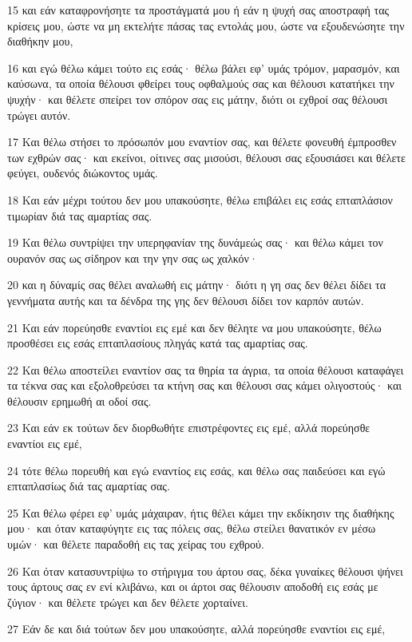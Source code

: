 \par 15 και εάν καταφρονήσητε τα προστάγματά μου ή εάν η ψυχή σας αποστραφή τας κρίσεις μου, ώστε να μη εκτελήτε πάσας τας εντολάς μου, ώστε να εξουδενώσητε την διαθήκην μου,
\par 16 και εγώ θέλω κάμει τούτο εις εσάς· θέλω βάλει εφ' υμάς τρόμον, μαρασμόν, και καύσωνα, τα οποία θέλουσι φθείρει τους οφθαλμούς σας και θέλουσι κατατήκει την ψυχήν· και θέλετε σπείρει τον σπόρον σας εις μάτην, διότι οι εχθροί σας θέλουσι τρώγει αυτόν.
\par 17 Και θέλω στήσει το πρόσωπόν μου εναντίον σας, και θέλετε φονευθή έμπροσθεν των εχθρών σας· και εκείνοι, οίτινες σας μισούσι, θέλουσι σας εξουσιάσει και θέλετε φεύγει, ουδενός διώκοντος υμάς.
\par 18 Και εάν μέχρι τούτου δεν μου υπακούσητε, θέλω επιβάλει εις εσάς επταπλάσιον τιμωρίαν διά τας αμαρτίας σας.
\par 19 Και θέλω συντρίψει την υπερηφανίαν της δυνάμεώς σας· και θέλω κάμει τον ουρανόν σας ως σίδηρον και την γην σας ως χαλκόν·
\par 20 και η δύναμίς σας θέλει αναλωθή εις μάτην· διότι η γη σας δεν θέλει δίδει τα γεννήματα αυτής και τα δένδρα της γης δεν θέλουσι δίδει τον καρπόν αυτών.
\par 21 Και εάν πορεύησθε εναντίοι εις εμέ και δεν θέλητε να μου υπακούσητε, θέλω προσθέσει εις εσάς επταπλασίους πληγάς κατά τας αμαρτίας σας.
\par 22 Και θέλω αποστείλει εναντίον σας τα θηρία τα άγρια, τα οποία θέλουσι καταφάγει τα τέκνα σας και εξολοθρεύσει τα κτήνη σας και θέλουσι σας κάμει ολιγοστούς· και θέλουσιν ερημωθή αι οδοί σας.
\par 23 Και εάν εκ τούτων δεν διορθωθήτε επιστρέφοντες εις εμέ, αλλά πορεύησθε εναντίοι εις εμέ,
\par 24 τότε θέλω πορευθή και εγώ εναντίος εις εσάς, και θέλω σας παιδεύσει και εγώ επταπλασίως διά τας αμαρτίας σας.
\par 25 Και θέλω φέρει εφ' υμάς μάχαιραν, ήτις θέλει κάμει την εκδίκησιν της διαθήκης μου· και όταν καταφύγητε εις τας πόλεις σας, θέλω στείλει θανατικόν εν μέσω υμών· και θέλετε παραδοθή εις τας χείρας του εχθρού.
\par 26 Και όταν κατασυντρίψω το στήριγμα του άρτου σας, δέκα γυναίκες θέλουσι ψήνει τους άρτους σας εν ενί κλιβάνω, και οι άρτοι σας θέλουσιν αποδοθή εις εσάς με ζύγιον· και θέλετε τρώγει και δεν θέλετε χορταίνει.
\par 27 Εάν δε και διά τούτων δεν μου υπακούσητε, αλλά πορεύησθε εναντίοι εις εμέ,
